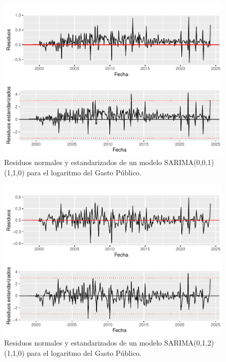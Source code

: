 \documentclass[
  12pt,
]{article}
\begin{document}
\begin{figure}[H]

{\centering \includegraphics[width=0.75\linewidth]{informe_files/figure-latex/unnamed-chunk-27-1} 

}

\caption{\label{residuos2} Residuos normales y estandarizados de un modelo SARIMA(0,0,1)(1,1,0) para el logaritmo del Gasto Público.}\label{fig:unnamed-chunk-27}
\end{figure}

\begin{figure}[H]

{\centering \includegraphics[width=0.75\linewidth]{informe_files/figure-latex/unnamed-chunk-28-1} 

}

\caption{\label{residuos3} Residuos normales y estandarizados de un modelo SARIMA(0,1,2)(1,1,0) para el logaritmo del Gasto Público.}\label{fig:unnamed-chunk-28}
\end{figure}
\end{document}
